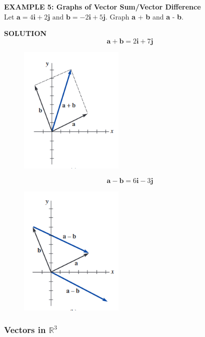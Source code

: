 \documentclass{article}
\begin{document}
\textbf{EXAMPLE 5: Graphs of Vector Sum/Vector Difference}\\

Let $\mathbf{a} = 4\mathbf{i} + 2\mathbf{j} \text{ and } \mathbf{b} = -2\mathbf{i} + 5\mathbf{j}$. Graph \textbf{a} + \textbf{b} and \textbf{a} - \textbf{b}.\vspace{0.5cm}

\textbf{SOLUTION}\\

\[\textbf{a} + \textbf{b} = 2\textbf{i} + 7\textbf{j}\]

\begin{figure}[H]
  \includegraphics[width=5cm]{images/figure12.PNG}
  \centering
\end{figure}

\vspace{10cm}

\[\textbf{a} - \textbf{b} = 6\textbf{i} - 3\textbf{j}\]

\begin{figure}[H]
  \includegraphics[width=5cm]{images/figure13.PNG}
  \centering
\end{figure}

\subsubsection{Vectors in $\mathbb{R}^3$}
\end{document}
